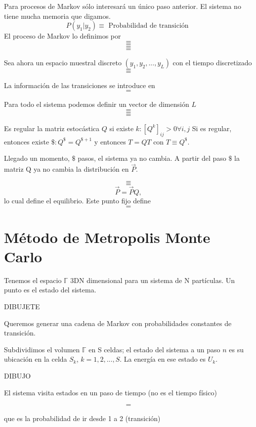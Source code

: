 \documentclass[10pt,oneside]{CBFT_book}
\begin{document}
Para procesos de Markov sólo interesará un único paso anterior. El sistema no tiene mucha memoria que 
digamos.
\[
	P(y_1|y_2) \equiv \text{ Probabilidad de transición }
\]
El proceso de Markov lo definimos por 
\[=\]
\[=\]
\[=\]
\[=\]

Sea ahora un espacio muestral discreto $(y_1,y_2,...,y_L)$ con el tiempo discretizado
\[=\]
\[=\]

La información de las transiciones se introduce en 
\[=\]

Para todo el sistema podemos definir un vector de dimensión $L$
\[=\]
\[=\]
\[=\]

Es regular la matriz estocástica $ Q $ si existe $ k : [ Q^k ]_{ij} > 0 \forall i,j $
Si es regular, entonces existe $ \$ : Q^\$ =  Q^{\$+1} $ y entonces $T = QT$ con $T\equiv Q^\$$.

Llegado un momento, $\$$ pasos, el sistema ya no cambia. A partir del paso $\$$ la matriz Q ya no cambia
la distribución en $\vec{P}$.


\[=\]
\[=\]
\[
	\vec{P} = \vec{P} Q,
\]
lo cual define el equilibrio. Este punto fijo define
\[ =\]

\section{Método de Metropolis Monte Carlo}

Tenemos el espacio $ \mathbb{\Gamma} $ 3DN dimensional para un sistema de N partículas.
Un punto es el estado del sistema.

DIBUJETE

Queremos generar una cadena de Markov con probabilidades constantes de transición.

Subdividimos el volumen $ \mathbb{\Gamma} $  en S celdas; el estado del sistema a un paso $n$ es su
ubicación en la celda $S_k$, $k=1,2,...,S$. La energía en ese estado es $U_k$.

DIBUJO 

El sistema visita estados en un paso de tiempo (no es el tiempo físico)

\[=\]

que es la probabilidad de ir desde 1 a 2 (transición)
\end{document}
